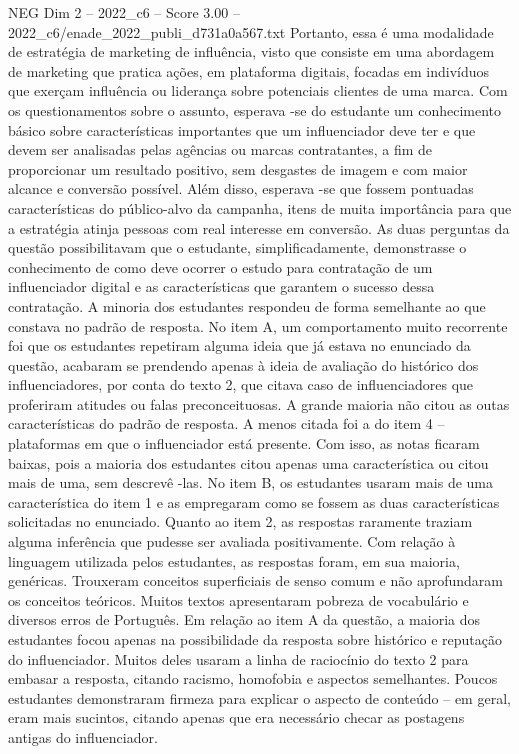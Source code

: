 \begin{textsample}{NEG Dim 2 – 2022\_c6 – Score 3.00 – 2022\_c6/enade\_2022\_publi\_d731a0a567.txt}
Portanto, essa é uma modalidade de estratégia de marketing de influência, visto que consiste em uma abordagem de marketing que pratica ações, em plataforma digitais, focadas em indivíduos que exerçam influência ou liderança sobre potenciais clientes de uma marca.
Com os questionamentos sobre o assunto, esperava -se do estudante um conhecimento básico sobre características importantes que um influenciador deve ter e que devem ser analisadas pelas agências ou marcas contratantes, a fim de proporcionar um resultado positivo, sem desgastes de imagem e com maior alcance e conversão possível.
Além disso, esperava -se que fossem pontuadas características do público-alvo da campanha, itens de muita importância para que a estratégia atinja pessoas com real interesse em conversão.
As duas perguntas da questão possibilitavam que o estudante, simplificadamente, demonstrasse o conhecimento de como deve ocorrer o estudo para contratação de um influenciador digital e as características que garantem o sucesso dessa contratação.
A minoria dos estudantes respondeu de forma semelhante ao que constava no padrão de resposta.
No item A, um comportamento muito recorrente foi que os estudantes repetiram alguma ideia que já estava no enunciado da questão, acabaram se prendendo apenas à ideia de avaliação do histórico dos influenciadores, por conta do texto 2, que citava caso de influenciadores que proferiram atitudes ou falas preconceituosas.
A grande maioria não citou as outas características do padrão de resposta.
A menos citada foi a do item 4 – plataformas em que o influenciador está presente.
Com isso, as notas ficaram baixas, pois a maioria dos estudantes citou apenas uma característica ou citou mais de uma, sem descrevê -las.
No item B, os estudantes usaram mais de uma característica do item 1 e as empregaram como se fossem as duas características solicitadas no enunciado.
Quanto ao item 2, as respostas raramente traziam alguma inferência que pudesse ser avaliada positivamente.
Com relação à linguagem utilizada pelos estudantes, as respostas foram, em sua maioria, genéricas.
Trouxeram conceitos superficiais de senso comum e não aprofundaram os conceitos teóricos.
Muitos textos apresentaram pobreza de vocabulário e diversos erros de Português.
Em relação ao item A da questão, a maioria dos estudantes focou apenas na possibilidade da resposta sobre histórico e reputação do influenciador.
Muitos deles usaram a linha de raciocínio do texto 2 para embasar a resposta, citando racismo, homofobia e aspectos semelhantes.
Poucos estudantes demonstraram firmeza para explicar o aspecto de conteúdo – em geral, eram mais sucintos, citando apenas que era necessário checar as postagens antigas do influenciador.

\end{textsample}
